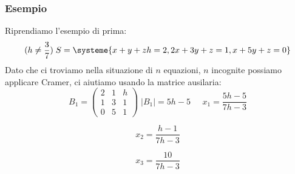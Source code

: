 \subsubsection{Esempio}
Riprendiamo l'esempio di prima:
$$
(h \neq \frac{3}{7}) \; S =  
\systeme{
x+y+zh = 2,
2x+3y+z = 1,
x+5y+z = 0
}
$$
Dato che ci troviamo nella situazione di $n$ equazioni, $n$ incognite possiamo applicare Cramer, ci aiutiamo usando la matrice ausilaria:
$$ 
B_1 = 
\begin{pmatrix}
2 & 1 & h \\
1 & 3 & 1 \\
0 & 5 & 1 
\end{pmatrix} \; |B_1| = 5h-5
\; \; \; \; \; x_1 = \frac{5h-5}{7h-3} 
$$

$$
x_2 = \frac{h-1}{7h-3} 
$$

$$
x_3 = \frac{10}{7h-3} 
$$










